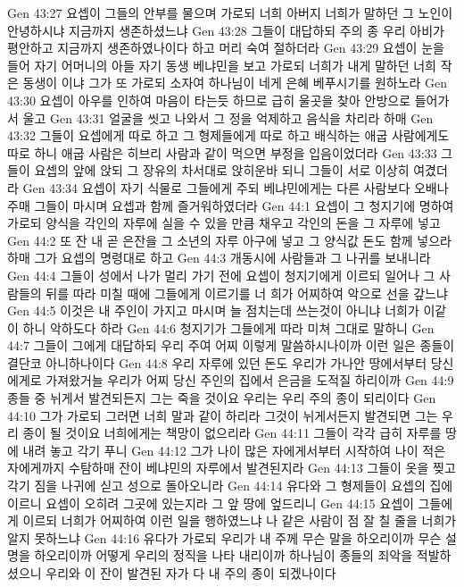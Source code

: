 Gen 43:27  요셉이 그들의 안부를 물으며 가로되 너희 아버지 너희가 말하던 그 노인이 안녕하시냐 지금까지 생존하셨느냐
Gen 43:28  그들이 대답하되 주의 종 우리 아비가 평안하고 지금까지 생존하였나이다 하고 머리 숙여 절하더라
Gen 43:29  요셉이 눈을 들어 자기 어머니의 아들 자기 동생 베냐민을 보고 가로되 너희가 내게 말하던 너희 작은 동생이 이냐 그가 또 가로되 소자여 하나님이 네게 은혜 베푸시기를 원하노라
Gen 43:30  요셉이 아우를 인하여 마음이 타는듯 하므로 급히 울곳을 찾아 안방으로 들어가서 울고
Gen 43:31  얼굴을 씻고 나와서 그 정을 억제하고 음식을 차리라 하매
Gen 43:32  그들이 요셉에게 따로 하고 그 형제들에게 따로 하고 배식하는 애굽 사람에게도 따로 하니 애굽 사람은 히브리 사람과 같이 먹으면 부정을 입음이었더라
Gen 43:33  그들이 요셉의 앞에 앉되 그 장유의 차서대로 앉히운바 되니 그들이 서로 이상히 여겼더라
Gen 43:34  요셉이 자기 식물로 그들에게 주되 베냐민에게는 다른 사람보다 오배나 주매 그들이 마시며 요셉과 함께 즐거워하였더라
Gen 44:1  요셉이 그 청지기에 명하여 가로되 양식을 각인의 자루에 실을 수 있을 만큼 채우고 각인의 돈을 그 자루에 넣고
Gen 44:2  또 잔 내 곧 은잔을 그 소년의 자루 아구에 넣고 그 양식값 돈도 함께 넣으라 하매 그가 요셉의 명령대로 하고
Gen 44:3  개동시에 사람들과 그 나귀를 보내니라
Gen 44:4  그들이 성에서 나가 멀리 가기 전에 요셉이 청지기에게 이르되 일어나 그 사람들의 뒤를 따라 미칠 때에 그들에게 이르기를 너 희가 어찌하여 악으로 선을 갚느냐
Gen 44:5  이것은 내 주인이 가지고 마시며 늘 점치는데 쓰는것이 아니냐 너희가 이같이 하니 악하도다 하라
Gen 44:6  청지기가 그들에게 따라 미쳐 그대로 말하니
Gen 44:7  그들이 그에게 대답하되 우리 주여 어찌 이렇게 말씀하시나이까 이런 일은 종들이 결단코 아니하나이다
Gen 44:8  우리 자루에 있던 돈도 우리가 가나안 땅에서부터 당신에게로 가져왔거늘 우리가 어찌 당신 주인의 집에서 은금을 도적질 하리이까
Gen 44:9  종들 중 뉘게서 발견되든지 그는 죽을 것이요 우리는 우리 주의 종이 되리이다
Gen 44:10  그가 가로되 그러면 너희 말과 같이 하리라 그것이 뉘게서든지 발견되면 그는 우리 종이 될 것이요 너희에게는 책망이 없으리라
Gen 44:11  그들이 각각 급히 자루를 땅에 내려 놓고 각기 푸니
Gen 44:12  그가 나이 많은 자에게서부터 시작하여 나이 적은 자에게까지 수탐하매 잔이 베냐민의 자루에서 발견된지라
Gen 44:13  그들이 옷을 찢고 각기 짐을 나귀에 싣고 성으로 돌아오니라
Gen 44:14  유다와 그 형제들이 요셉의 집에 이르니 요셉이 오히려 그곳에 있는지라 그 앞 땅에 엎드리니
Gen 44:15  요셉이 그들에게 이르되 너희가 어찌하여 이런 일을 행하였느냐 나 같은 사람이 점 잘 칠 줄을 너희가 알지 못하느냐
Gen 44:16  유다가 가로되 우리가 내 주께 무슨 말을 하오리이까 무슨 설명을 하오리이까 어떻게 우리의 정직을 나타 내리이까 하나님이 종들의 죄악을 적발하셨으니 우리와 이 잔이 발견된 자가 다 내 주의 종이 되겠나이다
